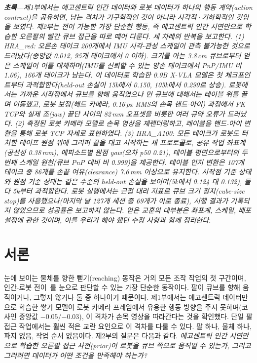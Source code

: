 \documentclass[conference,10pt]{IEEEtran}
\newcommand{\mm}{\,mm\xspace}
\newcommand{\partabstract}[1]{\noindent\textbf{\textit{초록}}---\textit{#1}\par\medskip}
\begin{document}
\partabstract{제1부에서는 에고센트릭 인간 데이터와 로봇 데이터가 하나의 행동 계약(action contract)을 공유하면, 남는 격차가 기구학적인
것이 아니라 시각적·기하학적인 것임을 보였다. 제2부는 전이 가능한 가장 단순한 행동, 즉 에고센트릭 인간 시연만으로 학습한
오른팔의 빨간 큐브 접근을 따로 떼어 다룬다. 세 차례의 반복을 보고한다. (1) HRA\_red: 오른손 테이크 200개에서 IMU
시각-관성 스케일이 관측 불가능한 것으로 드러났다(중앙값 0.012, 95개 테이크에서 0 이하). 크기를 아는 3.8\,cm 큐브로부터
얻은 스케일이 이를 대체하며(IMU를 신뢰할 수 있는 양손 테이크에서 PnP/IMU 비 1.06), 166개 테이크가 남는다. 이 데이터로
학습한 0.9B X-VLA 모델은 첫 체크포인트부터 과적합한다(held-out 손실이 15k에서 0.150, 105k에서 0.299로 상승). 로봇에서는
가까운 시작점에서 큐브를 향해 움직였으나 먼 큐브에 대해서는 테이블 위를 끌며 이동했고, 로봇 보정(헤드 카메라, 0.16\,px
RMS의 손목 핸드-아이) 과정에서 FK TCP와 실제 조(jaw) 끝단 사이의 82\mm 오프셋을 비롯한 여러 규약 오류가 드러났다.
(2) 측정된 로봇 카메라 모델로 손목 영상을 재렌더링하고, 레이블을 핸드-아이 변환을 통해 로봇 TCP 자세로 표현하였다.
(3) HRA\_A100: 모든 테이크가 로봇도 터치한 테이프 원점 위에 그리퍼 끝을 대고 시작하는 새 프로토콜로, 공유 작업
좌표계(공선성 0.38\mm), 에피소드별 원점 yaw(오차 p50 0.21\textdegree), 테이블 평면으로부터의 두 번째 스케일 원천(큐브
PnP 대비 비 0.999)을 제공한다. 테이블 인지 변환은 107개 테이크 중 86개를 손끝 여유(clearance) 7.6\mm 이상으로 유지한다.
시작점 기준 상태와 원점 기준 상태는 같은 수준의 held-out 손실을 보이며(5k에서 0.124 대 0.132), 둘 다 5k부터 과적합한다.
로봇 실행에서는 근접 대리 지표로 큐브 크기 정지(cube-size stop)를 사용했으나(마지막 날 127개 세션 중 69개가 이로 종료),
시행 결과가 기록되지 않았으므로 성공률은 보고하지 않는다. 얻은 교훈의 대부분은 좌표계, 스케일, 배포 설정에 관한 것이며,
이를 우리가 해야 했던 수정 사항과 함께 정리한다.}
\section{서론}\label{p2:sec:intro}
눈에 보이는 물체를 향한 뻗기(reaching) 동작은 거의 모든 조작 작업의 첫 구간이며, 인간-로봇 전이~\cite{kareer2024egomimic}를
눈으로 판단할 수 있는 가장 단순한 동작이다. 팔이 큐브를 향해 움직이거나, 그렇지 않거나 둘 중 하나이기 때문이다.
제1부에서는 에고센트릭 데이터만으로 학습한 쌓기 모델이 로봇 카메라 프레임에서 유용한 행동 방향을 주지 못하며(코사인 중앙값
$-0.05$/$-0.03$), 이 격차가 손목 영상을 따라간다는 것을 확인했다. 단일 팔 접근 작업에서는 훨씬 적은 교란 요인으로 이
격차를 다룰 수 있다. 팔 하나, 물체 하나, 파지 없음, 작업 순서 없음이다. 제2부의 질문은 다음과 같다. \emph{에고센트릭
인간 시연만으로 학습한 오른팔 접근 사전(prior)이 로봇을 큐브 쪽으로 움직일 수 있는가, 그리고 그러려면 데이터가 어떤 조건을
만족해야 하는가?}
\end{document}
